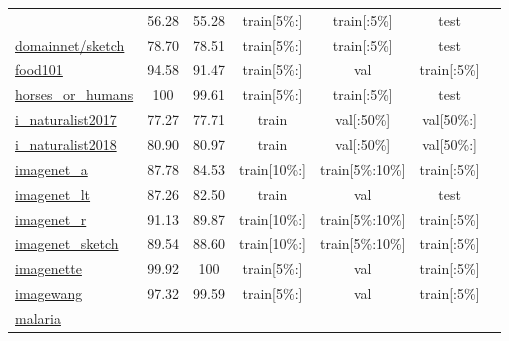 \documentclass{article} \usepackage{iclr2023_conference,times}
\begin{document}
\begin{table*}[h]
\begin{tabular}{lcccccc}
&  56.28  &  55.28
 & train[{\tiny5\%:}] & train[{\tiny:5\%}] & test &
 \citep{Peng2019MomentMF}
 \\
\href{https://www.tensorflow.org/datasets/catalog/domainnet#sketch}{domainnet/sketch}
&  78.70  &  78.51
 & train[{\tiny5\%:}] & train[{\tiny:5\%}] & test &
 \citep{Peng2019MomentMF}
 \\
\href{https://www.tensorflow.org/datasets/catalog/food101}{food101}
&  94.58  &  91.47
 & train[{\tiny5\%:}] & val & train[{\tiny:5\%}] &
 \citep{Bossard2014Food101M}
 \\
\href{https://www.tensorflow.org/datasets/catalog/horses_or_humans}{horses\_or\_humans}
&  100  &  99.61
 & train[{\tiny5\%:}] & train[{\tiny:5\%}] & test &
 \citep{horses_or_humans}
 \\
\href{https://www.tensorflow.org/datasets/catalog/i_naturalist2017}{i\_naturalist2017}
&  77.27  &  77.71
 & train & val[{\tiny:50\%}] & val[{\tiny50\%:}] & 
 \citep{Horn2018TheIS}
 \\
\href{https://www.tensorflow.org/datasets/catalog/i_naturalist2018}{i\_naturalist2018}
&  80.90  &  80.97
 & train & val[{\tiny:50\%}] & val[{\tiny50\%:}] & 
 \citep{Horn2018TheIS}
 \\
\href{https://www.tensorflow.org/datasets/catalog/imagenet_a}{imagenet\_a}
&  87.78  &  84.53
 & train[{\tiny10\%:}] & train[{\tiny5\%:10\%}] & train[{\tiny:5\%}] & 
 \citep{Hendrycks2021NaturalAE}
 \\
\href{https://www.tensorflow.org/datasets/catalog/imagenet_lt}{imagenet\_lt}
&  87.26  &  82.50
 & train & val & test & 
 \citep{Liu2019LargeScaleLR}
 \\
\href{https://www.tensorflow.org/datasets/catalog/imagenet_r}{imagenet\_r}
&  91.13  &  89.87
 & train[{\tiny10\%:}] & train[{\tiny5\%:10\%}] & train[{\tiny:5\%}] & 
 \citep{Hendrycks2021TheMF}
 \\
\href{https://www.tensorflow.org/datasets/catalog/imagenet_sketch}{imagenet\_sketch}
&  89.54  &  88.60
 & train[{\tiny10\%:}] & train[{\tiny5\%:10\%}] & train[{\tiny:5\%}] & 
 \citep{Wang2019LearningRG}
 \\
\href{https://www.tensorflow.org/datasets/catalog/imagenette}{imagenette}
&  99.92  &  100
 & train[{\tiny5\%:}] & val & train[{\tiny:5\%}] & 
 \citep{imagenette}
 \\
\href{https://www.tensorflow.org/datasets/catalog/imagewang}{imagewang}
&  97.32  &  99.59
 & train[{\tiny5\%:}] & val & train[{\tiny:5\%}] & 
 \citep{imagewang}
 \\
\href{https://www.tensorflow.org/datasets/catalog/malaria}{malaria}

\end{tabular}
\end{table*}
\end{document}
